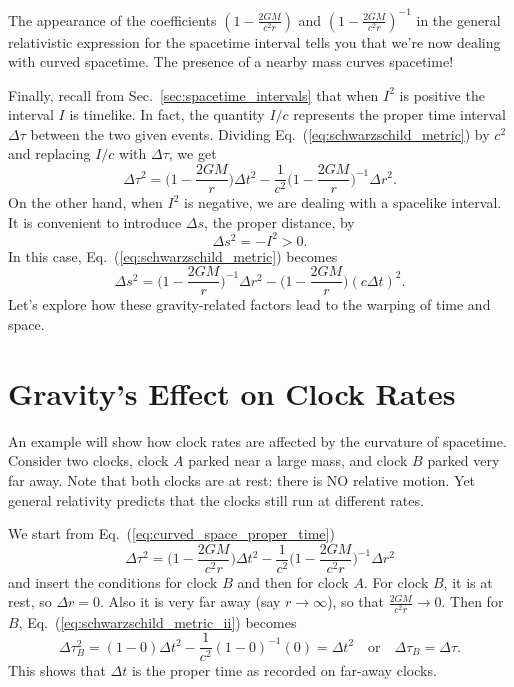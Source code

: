 The appearance of the coefficients $(1-\frac{2GM}{c^2r})$ and
$(1-\frac{2GM}{c^2r})^{-1}$ in the general relativistic expression for
the spacetime interval tells you that we're now dealing with curved
spacetime.  The presence of a nearby mass curves spacetime!  

Finally, recall from Sec.~\ref{sec:spacetime_intervals} that when
$I^2$ is positive the interval $I$ is timelike. In fact, the quantity
$I/c$ represents the proper time interval $\Delta\tau$ between the two
given events.  Dividing Eq.~(\ref{eq:schwarzschild_metric}) by $c^2$
and replacing $I/c$ with $\Delta\tau$, we get
\begin{equation}   
 \Delta\tau^2 = \biggl(1-\frac{2GM}{r}\biggr)\Delta t^2 - 
  \frac{1}{c^2}\biggl(1-\frac{2GM}{r}\biggr)^{-1}\Delta r^2.
\label{eq:curved_space_proper_time}
\end{equation}
On the other hand, when $I^2$ is negative, we are dealing with a
spacelike interval.  It is convenient to introduce $\Delta s$, the
proper distance, by 
\begin{equation}
 \Delta s^2 = -I^2 > 0.
\end{equation}
In this case, Eq.~(\ref{eq:schwarzschild_metric}) becomes
\begin{equation}
  \Delta s^2 =  \biggl(1-\frac{2GM}{r}\biggr)^{-1}\Delta r^2 -  
  \biggl(1-\frac{2GM}{r}\biggr)(c\Delta t)^2.
 \label{eq:curved_space_proper_distance}
\end{equation}
Let's explore how these gravity-related factors lead to the warping of
time and space.

\section{Gravity's Effect on Clock Rates}

An example will show how clock rates are affected by the curvature of
spacetime.  Consider two clocks, clock $A$ parked near a large mass,
and clock $B$ parked very far away.  Note that both clocks are at
rest: there is NO relative motion.  Yet general relativity predicts
that the clocks still run at different rates.

We start from Eq.~(\ref{eq:curved_space_proper_time})
\begin{equation}
  \Delta\tau^2 = \biggl(1-\frac{2GM}{c^2 r}\biggr)\Delta t^2-
  \frac{1}{c^2}\biggl(1-\frac{2GM}{c^2 r}\biggr)^{-1}\Delta r^2 
\label{eq:schwarzschild_metric_ii}
\end{equation}
and insert the conditions for clock $B$ and then for clock $A$.  For
clock $B$, it is at rest, so $\Delta r=0$.  Also it is very far away
(say $r\to\infty$), so that $\frac{2GM}{c^2r}\to 0$.  Then for $B$,
Eq.~(\ref{eq:schwarzschild_metric_ii}) becomes
\begin{equation}
  \Delta \tau_B^2 = (1-0)\Delta t^2 - \frac{1}{c^2} (1-0)^{-1} (0) = \Delta
  t^2 \quad\text{or}\quad \Delta\tau_B = \Delta\tau.
\end{equation}
This shows that $\Delta t$ is the proper time as recorded on far-away
clocks.

